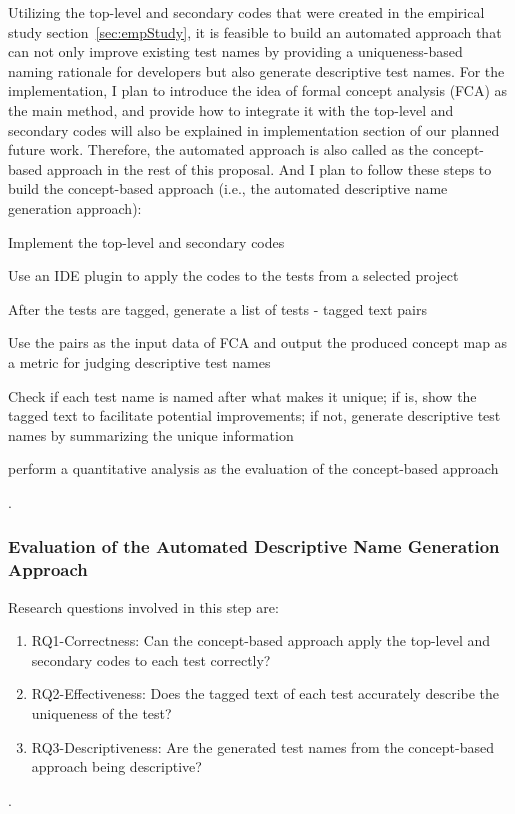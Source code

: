 Utilizing the top-level and secondary codes that were created in the empirical study section~\cref{sec:empStudy}, it is feasible to build an automated approach that can not only improve existing test names by providing a uniqueness-based naming rationale for developers but also generate descriptive test names.
%
For the implementation, I plan to introduce the idea of formal concept analysis (FCA) as the main method, and provide how to integrate it with the top-level and secondary codes will also be explained in implementation section of our planned future work.
%
Therefore, the automated approach is also called as the concept-based approach in the rest of this proposal.
%
And I plan to follow these steps to build the concept-based approach (i.e., the automated descriptive name generation approach):
\begin{enumerate*}
    \item Implement the top-level and secondary codes
    \item Use an IDE plugin to apply the codes to the tests from a selected project
    \item After the tests are tagged, generate a list of tests - tagged text pairs
    \item Use the pairs as the input data of FCA and output the produced concept map as a metric for judging descriptive test names
    \item Check if each test name is named after what makes it unique; if is, show the tagged text to facilitate potential improvements; if not, generate descriptive test names by summarizing the unique information
    \item perform a quantitative analysis as the evaluation of the concept-based approach
\end{enumerate*}.

\subsubsection{Evaluation of the Automated Descriptive Name Generation Approach}

Research questions involved in this step are:
%
\begin{enumerate}
    \item RQ1-Correctness: Can the concept-based approach apply the top-level and secondary codes to each test correctly?
    \item RQ2-Effectiveness: Does the tagged text of each test accurately describe the uniqueness of the test?
    \item RQ3-Descriptiveness: Are the generated test names from the concept-based approach being descriptive?
\end{enumerate}.

